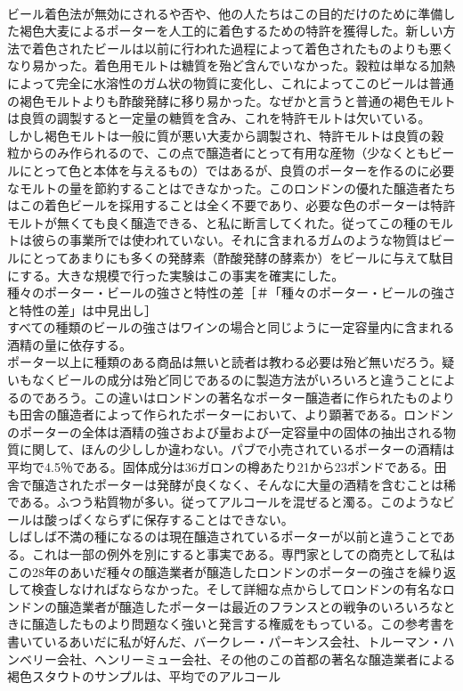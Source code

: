 \documentclass[8pt]{extreport}
\begin{document}
\begin{CJK}{UTF8}{min}
\\	ビール着色法が無効にされるや否や、他の人たちはこの目的だけのために準備した褐色大麦によるポーターを人工的に着色するための特許を獲得した。新しい方法で着色されたビールは以前に行われた過程によって着色されたものよりも悪くなり易かった。着色用モルトは糖質を殆ど含んでいなかった。穀粒は単なる加熱によって完全に水溶性のガム状の物質に変化し、これによってこのビールは普通の褐色モルトよりも酢酸発酵に移り易かった。なぜかと言うと普通の褐色モルトは良質の調製すると一定量の糖質を含み、これを特許モルトは欠いている。
\\	しかし褐色モルトは一般に質が悪い大麦から調製され、特許モルトは良質の穀粒からのみ作られるので、この点で醸造者にとって有用な産物（少なくともビールにとって色と本体を与えるもの）ではあるが、良質のポーターを作るのに必要なモルトの量を節約することはできなかった。このロンドンの優れた醸造者たちはこの着色ビールを採用することは全く不要であり、必要な色のポーターは特許モルトが無くても良く醸造できる、と私に断言してくれた。従ってこの種のモルトは彼らの事業所では使われていない。それに含まれるガムのような物質はビールにとってあまりにも多くの発酵素（酢酸発酵の酵素か）をビールに与えて駄目にする。大きな規模で行った実験はこの事実を確実にした。
\\	種々のポーター・ビールの強さと特性の差［＃「種々のポーター・ビールの強さと特性の差」は中見出し］
\\	すべての種類のビールの強さはワインの場合と同じように一定容量内に含まれる酒精の量に依存する。
\\	ポーター以上に種類のある商品は無いと読者は教わる必要は殆ど無いだろう。疑いもなくビールの成分は殆ど同じであるのに製造方法がいろいろと違うことによるのであろう。この違いはロンドンの著名なポーター醸造者に作られたものよりも田舎の醸造者によって作られたポーターにおいて、より顕著である。ロンドンのポーターの全体は酒精の強さおよび量および一定容量中の固体の抽出される物質に関して、ほんの少ししか違わない。パブで小売されているポーターの酒精は平均で4.5％である。固体成分は36ガロンの樽あたり21から23ポンドである。田舎で醸造されたポーターは発酵が良くなく、そんなに大量の酒精を含むことは稀である。ふつう粘質物が多い。従ってアルコールを混ぜると濁る。このようなビールは酸っぱくならずに保存することはできない。
\\	しばしば不満の種になるのは現在醸造されているポーターが以前と違うことである。これは一部の例外を別にすると事実である。専門家としての商売として私はこの28年のあいだ種々の醸造業者が醸造したロンドンのポーターの強さを繰り返して検査しなければならなかった。そして詳細な点からしてロンドンの有名なロンドンの醸造業者が醸造したポーターは最近のフランスとの戦争のいろいろなときに醸造したものより問題なく強いと発言する権威をもっている。この参考書を書いているあいだに私が好んだ、バークレー・パーキンス会社、トルーマン・ハンベリー会社、ヘンリーミュー会社、その他のこの首都の著名な醸造業者による褐色スタウトのサンプルは、平均でのアルコール

\end{CJK}
\end{document}
